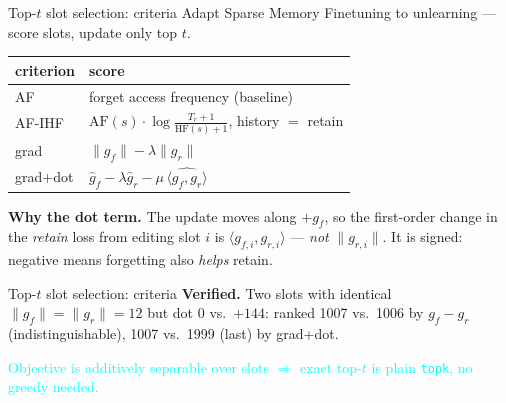 \documentclass{beamer}
\newcommand{\pierre}[1]{\textcolor{cyan}{#1}}
\newcommand{\gf}{\ensuremath{g_f}}
\newcommand{\gr}{\ensuremath{g_r}}
\newcommand{\gfi}{\ensuremath{g_{f,i}}}
\newcommand{\gri}{\ensuremath{g_{r,i}}}
\begin{document}
\begin{frame}{Top-$t$ slot selection: criteria}
Adapt Sparse Memory Finetuning to unlearning --- score slots, update only top $t$.
\begin{center}
\begin{tabular}{|l|l|}
\hline
criterion & score \\
\hline
AF      & forget access frequency (baseline) \\
AF-IHF  & $\text{AF}(s)\cdot\log\frac{T_r+1}{\text{HF}(s)+1}$, history $=$ retain \\
grad    & $\|\gf\| - \lambda\|\gr\|$ \\
grad+dot & $\hat{g}_f - \lambda\hat{g}_r - \mu\,\widehat{\langle \gf,\gr\rangle}$ \\
\hline
\end{tabular}
\end{center}

\textbf{Why the dot term.} The update moves along $+\gf$, so the first-order
change in the \emph{retain} loss from editing slot $i$ is
$\langle \gfi, \gri \rangle$ --- \emph{not} $\|\gri\|$. It is signed:
negative means forgetting also \emph{helps} retain.

\end{frame}

\begin{frame}{Top-$t$ slot selection: criteria}
\textbf{Verified.} Two slots with identical $\|\gf\|=\|\gr\|=12$ but dot $0$
vs.\ $+144$: ranked 1007 vs.\ 1006 by $\gf-\gr$ (indistinguishable), 1007
vs.\ 1999 (last) by grad+dot.

\medskip
\pierre{Objective is additively separable over slots $\Rightarrow$ exact top-$t$
is plain \texttt{topk}, no greedy needed.}
\end{frame}
\end{document}
